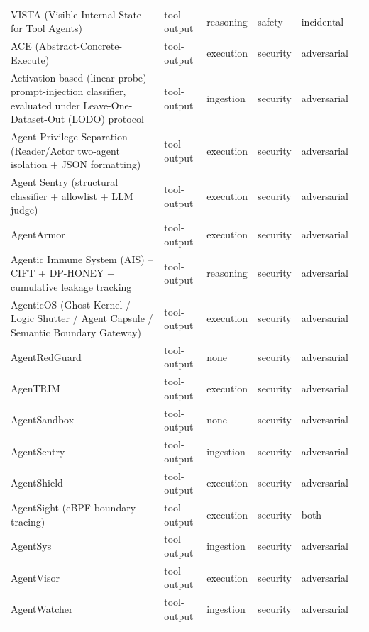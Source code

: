 \begin{longtable}{@{}p{}lllll@{}}
VISTA (Visible Internal State for Tool Agents) & tool-output & reasoning & safety & incidental & \cite{xu-2026-llm} \\
ACE (Abstract-Concrete-Execute) & tool-output & execution & security & adversarial & \cite{li-2025-ace} \\
Activation-based (linear probe) prompt-injection classifier, evaluated under Leave-One-Dataset-Out (LODO) protocol & tool-output & ingestion & security & adversarial & \cite{fomin-2026-benchmarks} \\
Agent Privilege Separation (Reader/Actor two-agent isolation + JSON formatting) & tool-output & execution & security & adversarial & \cite{cheng-2026-agent} \\
Agent Sentry (structural classifier + allowlist + LLM judge) & tool-output & execution & security & adversarial & \cite{sequeira-2026-agentsentry} \\
AgentArmor & tool-output & execution & security & adversarial & \cite{wang-2025-agentarmor} \\
Agentic Immune System (AIS) -- CIFT + DP-HONEY + cumulative leakage tracking & tool-output & reasoning & security & adversarial & \cite{chauhan-2026-caught} \\
AgenticOS (Ghost Kernel / Logic Shutter / Agent Capsule / Semantic Boundary Gateway) & tool-output & execution & security & adversarial & \cite{zhao-2026-agenticos} \\
AgentRedGuard & tool-output & none & security & adversarial & \cite{dingeto-2026-agentredbench} \\
AgenTRIM & tool-output & execution & security & adversarial & \cite{betser-2026-agentrim} \\
AgentSandbox & tool-output & none & security & adversarial & \cite{zhang-2025-llm} \\
AgentSentry & tool-output & ingestion & security & adversarial & \cite{zhang-2026-agentsentry} \\
AgentShield & tool-output & execution & security & adversarial & \cite{rassul-2026-agentshield} \\
AgentSight (eBPF boundary tracing) & tool-output & execution & security & both & \cite{zheng-2025-agentsight} \\
AgentSys & tool-output & ingestion & security & adversarial & \cite{wen-2026-agentsys} \\
AgentVisor & tool-output & execution & security & adversarial & \cite{ying-2026-agentvisor} \\
AgentWatcher & tool-output & ingestion & security & adversarial & \cite{wang-2026-agentwatcher} \\

\end{longtable}
